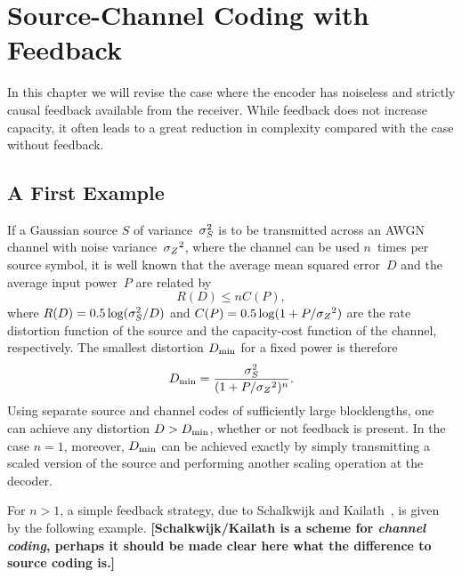 \chapter{Source-Channel Coding with Feedback}
\label{ch:feedback}

In this chapter we will revise the case where the encoder has noiseless and
strictly causal feedback available from the receiver. While feedback does not
increase capacity, it often leads to a great reduction in complexity compared
with the case without feedback. 


\section{A First Example}

If a Gaussian source $S$ of variance~${\sigma_S^2}$ is to be transmitted across an AWGN
channel with noise variance~${{\sigma_Z}^2}$, where the channel can be used $n$~times per
source symbol, it is well known that the average mean squared error~$D$ and the
average input power~$P$ are related by
\begin{equation}
  \label{eq:shannonlimit1}
  R(D) \le nC(P),
\end{equation}
where $R(D) = 0.5 \log({\sigma_S^2}/D)$ and $C(P) = 0.5\log(1+P/{{\sigma_Z}^2})$ are the rate
distortion function of the source and the capacity-cost function of the channel,
respectively. The smallest distortion $D_{\min}$ for a fixed power is therefore
\begin{equation}
  \label{eq:mindist}
  D_{\min} = \frac{{\sigma_S^2}}{(1 + P/{{\sigma_Z}^2})^n}.
\end{equation}
Using separate source and channel codes of sufficiently large blocklengths, one
can achieve any distortion $D > D_{\min}$, whether or not feedback is present.
In the case $n=1$, moreover, $D_{\min}$ can be achieved exactly by simply
transmitting a scaled version of the source and performing another scaling
operation at the decoder. 

For $n > 1$, a simple feedback strategy, due to Schalkwijk and
Kailath~\cite{SchalkwijkK1966}, is given by the following example.
\textbf{[Schalkwijk\slash Kailath is a scheme for \emph{channel coding}, perhaps
it should be made clear here what the difference to source coding is.]}

